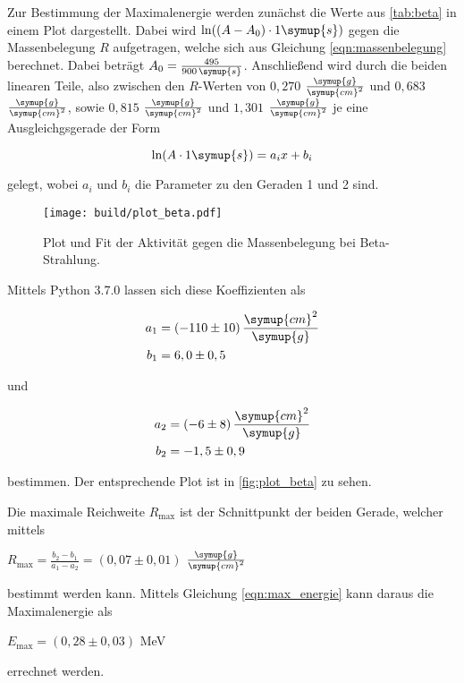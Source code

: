 Zur Bestimmung der Maximalenergie werden zunächst die Werte aus \autoref{tab:beta} in einem Plot dargestellt.
Dabei wird $\ln((A - A_0) \cdot 1 \symup{s})$ gegen die Massenbelegung $R$ aufgetragen, welche sich aus Gleichung \eqref{eqn:massenbelegung} berechnet.
Dabei beträgt $A_0 = \frac{495}{900 \, \symup{s}}$.
Anschließend wird durch die beiden linearen Teile,
also zwischen den $R$-Werten von $0,270$ $\frac{\symup{g}}{\symup{cm}^2}$ und $0,683$ $\frac{\symup{g}}{\symup{cm}^2}$, 
sowie $0,815$ $\frac{\symup{g}}{\symup{cm}^2}$ und $1,301$ $\frac{\symup{g}}{\symup{cm}^2}$ je eine Ausgleichgsgerade der Form

\begin{equation}
    \ln(A \cdot 1 \symup{s}) = a_i x + b_i
\end{equation}

gelegt, wobei $a_i$ und $b_i$ die Parameter zu den Geraden 1 und 2 sind.



\begin{figure}
    \centering
    \texttt{[image: build/plot\_beta.pdf]}
    \caption{Plot und Fit der Aktivität gegen die Massenbelegung bei Beta-Strahlung.}
    \label{fig:plot_beta}
\end{figure}

Mittels Python 3.7.0 lassen sich diese Koeffizienten als

\begin{align*}
    a_1 &= (-110 \pm 10) \, \frac{\symup{cm}^2}{\symup{g}}\\
    b_1 &= 6,0 \pm 0,5
\end{align*}

und

\begin{align*}
    a_2 &= (-6 \pm 8) \, \frac{\symup{cm}^2}{\symup{g}}\\
    b_2 &= -1,5 \pm 0,9
\end{align*}

bestimmen. Der entsprechende Plot ist in \autoref{fig:plot_beta} zu sehen.

Die maximale Reichweite $R_\text{max}$ ist der Schnittpunkt der beiden Gerade, welcher mittels

\begin{center}
    $R_\text{max} = \frac{b_2 - b_1}{a_1 - a_2} = (0,07 \pm 0,01)$ $\frac{\symup{g}}{\symup{cm}^2}$
\end{center}

bestimmt werden kann. Mittels Gleichung \eqref{eqn:max_energie} kann daraus die Maximalenergie als

\begin{center}
    $E_\text{max} = (0,28 \pm 0,03)$ MeV
\end{center}

errechnet werden.